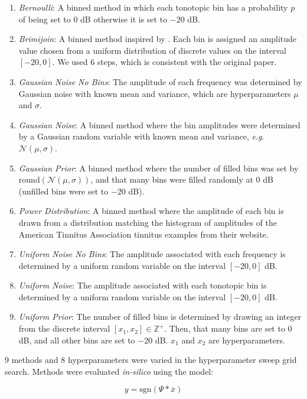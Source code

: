 \documentclass[journal]{IEEEtran}
\newcommand{\eg}{\textit{e}.\textit{g}.\ }
\begin{document}
\begin{enumerate}
  \item \textit{Bernoulli}: A binned method in which each tonotopic bin
  has a probability $p$ of being set to $0$ dB otherwise it is set to $-20$ dB.
  \item \textit{Brimijoin}: A binned method inspired by \cite{brimijoinInternalRepresentationVowel2013}.
  Each bin is assigned an amplitude value chosen from a uniform distribution of discrete values
  on the interval $[-20, 0]$. We used $6$ steps, which is consistent with the original paper.
  \item \textit{Gaussian Noise No Bins}: The amplitude of each frequency was determined by
  Gaussian noise with known mean and variance, which are hyperparameters $\mu$ and $\sigma$.
  \item \textit{Gaussian Noise}: A binned method where the bin amplitudes were
  determined by a Gaussian random variable with known mean and variance, \eg $\mathcal{N}(\mu, \sigma)$.
  \item \textit{Gaussian Prior}: A binned method where the number of filled bins
  was set by $\mathrm{round}(\mathcal{N}(\mu, \sigma))$,
  and that many bins were filled randomly at $0$ dB (unfilled bins were set to $-20$ dB).
  \item \textit{Power Distribution}: A binned method where the amplitude of each bin
  is drawn from a distribution matching the histogram of amplitudes
  of the American Tinnitus Association tinnitus examples from their website.
  \item \textit{Uniform Noise No Bins}: The amplitude associated with each frequency
  is determined by a uniform random variable on the interval $[-20, 0]$ dB.
  \item \textit{Uniform Noise}: The amplitude associated with each tonotopic bin
  is determined by a uniform random variable on the interval $[-20, 0]$ dB.
  \item \textit{Uniform Prior}: The number of filled bins is determined by drawing an integer
  from the discrete interval $[x_1, x_2] \in \mathbb{Z}^+$. Then, that many bins are set to $0$ dB,
  and all other bins are set to $-20$ dB. $x_1$ and $x_2$ are hyperparameters.
\end{enumerate}

9 methods and 8 hyperparameters were varied in the hyperparameter sweep grid search.
Methods were evaluated \textit{in-silico} using the model:

\begin{equation}
  y = \mathrm{sgn}(\Psi * \bar{x})
\end{equation}
\end{document}
